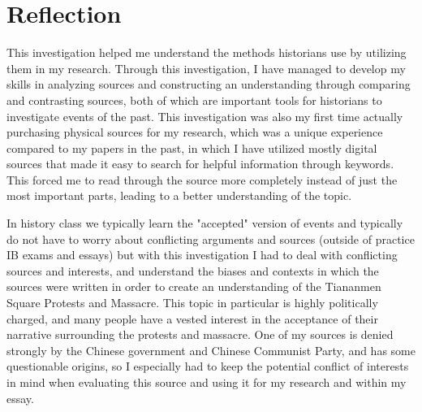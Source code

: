 \documentclass{paper}
\begin{document}
\section{Reflection}
This investigation helped me understand the methods historians use by utilizing them in my research.
Through this investigation, I have managed to develop my skills in analyzing sources and constructing an understanding through comparing and contrasting sources, both of which are important tools for historians to investigate events of the past.
This investigation was also my first time actually purchasing physical sources for my research, which was a unique experience compared to my papers in the past, in which I have utilized mostly digital sources that made it easy to search for helpful information through keywords.
This forced me to read through the source more completely instead of just the most important parts, leading to a better understanding of the topic.

In history class we typically learn the "accepted" version of events and typically do not have to worry about conflicting arguments and sources (outside of practice IB exams and essays) but with this investigation I had to deal with conflicting sources and interests, and understand the biases and contexts in which the sources were written in order to create an understanding of the Tiananmen Square Protests and Massacre.
This topic in particular is highly politically charged, and many people have a vested interest in the acceptance of their narrative surrounding the protests and massacre.
One of my sources is denied strongly by the Chinese government and Chinese Communist Party, and has some questionable origins, so I especially had to keep the potential conflict of interests in mind when evaluating this source and using it for my research and within my essay.

\singlespacing
\newpage
\printbibliography
\thispagestyle{empty}
\end{document}
